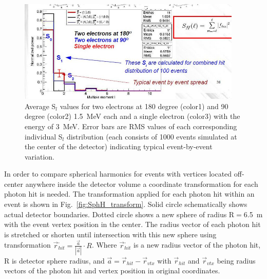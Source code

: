 \documentclass[12pt,twoside,letterpaper]{article}
\begin{document}
\begin{figure}[htb]
\centering
\includegraphics[angle=0,width=0.95\textwidth]{plots/Multiple_moment.JPG}
\caption{Average S$_l$ values for two electrons at 180 degree (color1) and 90 degree (color2) 1.5~MeV each and a single electron (color3) with the energy of 3~MeV. Error bars are RMS values of each corresponding individual S$_l$ distribution (each consists of 1000 events simulated at the center of the detector) indicating typical event-by-event variation.}
\label{fig:Moments}
\end{figure}


In order to compare spherical harmonics for events with vertices located off-center anywhere inside the detector volume a coordinate transformation for each photon hit is needed. The transformation applied for each photon hit within an event is shown in Fig.~\ref{fig:SphH_transform}. Solid circle schematically shows actual detector boundaries. Dotted circle shows a new sphere of radius R$=$6.5~m with the event vertex position in the center. The radius vector of each photon hit is stretched or shorten until intersection with this new sphere using transformation $\vec{r}^{,}_{hit} = \frac{\vec{a}}{|\vec{a}|} \cdot R$. Where $\vec{r}^{,}_{hit}$ is a new radius vector of the photon hit, R is detector sphere radius, and $\vec{a}=\vec{r}_{hit} - \vec{r}_{vtx}$ with $\vec{r}_{hit}$ and $\vec{r}_{vtx}$ being radius vectors of the photon hit and vertex position in original coordinates.
\end{document}
